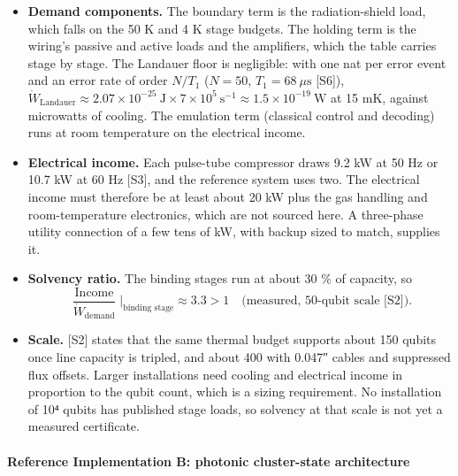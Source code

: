 \documentclass[
]{article}
\providecommand{\tightlist}{%
  \setlength{\itemsep}{0pt}\setlength{\parskip}{0pt}}
\begin{document}
\begin{itemize}
\tightlist
\item
  \textbf{Demand components.} The boundary term is the radiation-shield
  load, which falls on the 50 K and 4 K stage budgets. The holding term
  is the wiring's passive and active loads and the amplifiers, which the
  table carries stage by stage. The Landauer floor is negligible: with
  one nat per error event and an error rate of order \(N/T_1\)
  (\(N = 50\), \(T_1 = 68\ \mu\mathrm{s}\) {[}S6{]}),
  \(\dot W_{\mathrm{Landauer}} \approx 2.07 \times 10^{-25}\ \mathrm{J} \times 7 \times 10^{5}\ \mathrm{s}^{-1} \approx 1.5 \times 10^{-19}\ \mathrm{W}\)
  at 15 mK, against microwatts of cooling. The emulation term (classical
  control and decoding) runs at room temperature on the electrical
  income.
\item
  \textbf{Electrical income.} Each pulse-tube compressor draws 9.2 kW at
  50 Hz or 10.7 kW at 60 Hz {[}S3{]}, and the reference system uses two.
  The electrical income must therefore be at least about 20 kW plus the
  gas handling and room-temperature electronics, which are not sourced
  here. A three-phase utility connection of a few tens of kW, with
  backup sized to match, supplies it.
\item
  \textbf{Solvency ratio.} The binding stages run at about 30 \% of
  capacity, so
  \[\frac{\operatorname{Income}}{\dot W_{\mathrm{demand}}}\Big|_{\text{binding stage}} \approx 3.3 > 1 \quad \text{(measured, 50-qubit scale [S2])}.\]
\item
  \textbf{Scale.} {[}S2{]} states that the same thermal budget supports
  about 150 qubits once line capacity is tripled, and about 400 with
  0.047″ cables and suppressed flux offsets. Larger installations need
  cooling and electrical income in proportion to the qubit count, which
  is a sizing requirement. No installation of 10⁴ qubits has published
  stage loads, so solvency at that scale is not yet a measured
  certificate.
\end{itemize}

\paragraph{Reference Implementation B: photonic cluster-state
architecture}\label{reference-implementation-b-photonic-cluster-state-architecture}
\end{document}
